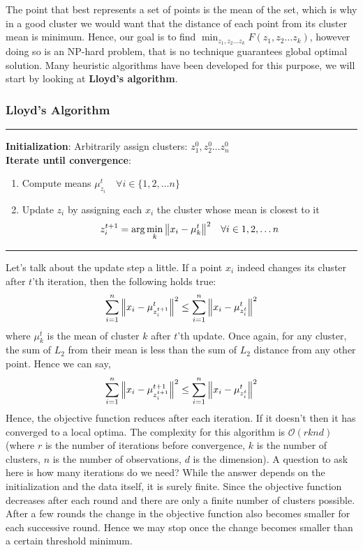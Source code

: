 \documentclass[12pt,a4paper]{article}
\begin{document}
The point that best represents a set of points is the mean of the set, which is why in a good cluster we would want that the distance of each point from its cluster mean is minimum. Hence, our goal is to find $\min_{z_1, z_2 \dots z_k} F(z_1, z_2 \dots z_k)$, however doing so is an NP-hard problem, that is no technique guarantees global optimal solution. Many heuristic algorithms have been developed for this purpose, we will start by looking at \textbf{Lloyd's algorithm}.

\subsubsection{Lloyd's Algorithm}
\par\noindent\rule{\textwidth}{0.4pt}
\textbf{Initialization}: Arbitrarily assign clusters: $z_1^0,z_2^0 \dots z_n^0$\\
\textbf{Iterate until convergence}:
\begin{enumerate}
    \item Compute means $\mu_{z_i}^t \quad \forall i \in \{1,2, \dots n\}$
    \item Update $z_i$ by assigning each $x_i$ the cluster whose mean is closest to it 
    $$z_i^{t+1} = \arg \min_k \norm{x_i - \mu_k^t}^2 \quad \forall i \in {1,2, \dots n}$$
\end{enumerate}
\par\noindent\rule{\textwidth}{0.4pt}

Let's talk about the update step a little. If a point $x_i$ indeed changes its cluster after $t$'th iteration, then the following holds true:
$$ \sum_{i=1}^{n} \norm{x_i - \mu^t_{z_i^{t+1}}}^2 \leq \sum_{i=1}^{n} \norm{x_i - \mu^t_{z_i^{t}}}^2$$ where $\mu_k^t$ is the mean of cluster $k$ after $t$'th update.
Once again, for any cluster, the sum of $L_2$ from their mean is less than the sum of $L_2$ distance from any other point. Hence we can say,
$$ \sum_{i=1}^{n} \norm{x_i - \mu^{t+1}_{z_i^{t+1}}}^2 \leq \sum_{i=1}^{n} \norm{x_i - \mu^t_{z_i^{t}}}^2$$
Hence, the objective function reduces after each iteration. If it doesn't then it has converged to a local optima. The complexity for this algorithm is $\mathcal{O}(rknd)$ (where $r$ is the number of iterations before convergence, $k$ is the number of clusters, $n$ is the number of observations, $d$ is the dimension).
A question to ask here is how many iterations do we need? While the answer depends on the initialization and the data itself, it is surely finite. Since the objective function decreases after each round and there are only a finite number of clusters possible. After a few rounds the change in the objective function also becomes smaller for each successive round. Hence we may stop once the change becomes smaller than a certain threshold minimum.
\end{document}
